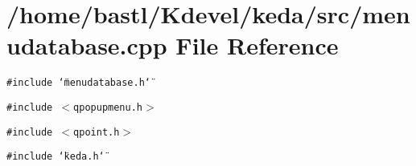 \section{/home/bastl/Kdevel/keda/src/menudatabase.cpp File Reference}
\label{menudatabase_8cpp}
{\tt \#include \char`\"{}menudatabase.h\char`\"{}}\par
{\tt \#include $<$qpopupmenu.h$>$}\par
{\tt \#include $<$qpoint.h$>$}\par
{\tt \#include \char`\"{}keda.h\char`\"{}}\par
